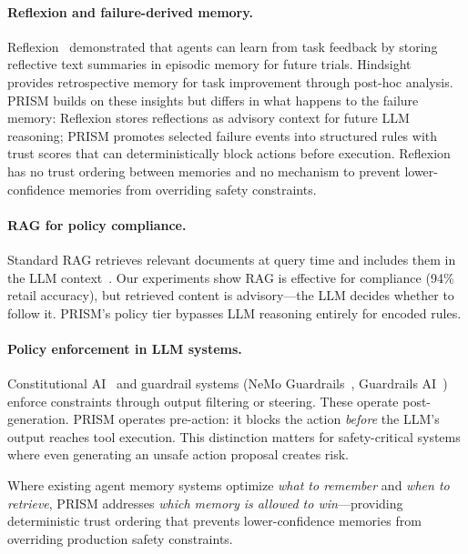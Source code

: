 \documentclass[11pt]{article}
\begin{document}
\paragraph{Reflexion and failure-derived memory.}
Reflexion~\cite{shinn2023reflexion} demonstrated that agents can learn from task feedback
by storing reflective text summaries in episodic memory for future trials.
Hindsight~\cite{hindsight2024} provides retrospective memory for task improvement through post-hoc analysis.
PRISM builds on these insights but differs in what happens to the failure memory:
Reflexion stores reflections as advisory context for future LLM reasoning;
PRISM promotes selected failure events into structured rules with trust scores
that can deterministically block actions before execution.
Reflexion has no trust ordering between memories and no mechanism
to prevent lower-confidence memories from overriding safety constraints.

\paragraph{RAG for policy compliance.}
Standard RAG retrieves relevant documents at query time
and includes them in the LLM context~\cite{lewis2020rag}.
Our experiments show RAG is effective for compliance (94\% retail accuracy),
but retrieved content is advisory---the LLM decides whether to follow it.
PRISM's policy tier bypasses LLM reasoning entirely for encoded rules.

\paragraph{Policy enforcement in LLM systems.}
Constitutional AI~\cite{bai2022constitutional} and guardrail systems
(NeMo Guardrails~\cite{rebedea2023nemo}, Guardrails AI~\cite{guardrailsai2024}) enforce constraints through output filtering or steering.
These operate post-generation. PRISM operates pre-action:
it blocks the action \emph{before} the LLM's output reaches tool execution.
This distinction matters for safety-critical systems
where even generating an unsafe action proposal creates risk.

\medskip
\noindent Where existing agent memory systems optimize \emph{what to remember}
and \emph{when to retrieve}, PRISM addresses \emph{which memory is allowed to win}---providing
deterministic trust ordering that prevents lower-confidence memories
from overriding production safety constraints.

\end{document}

